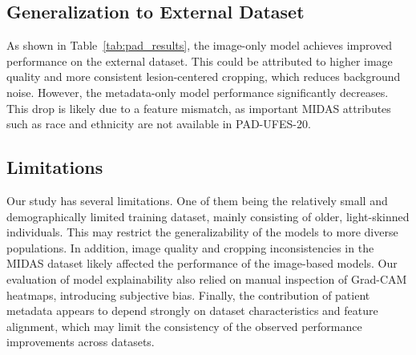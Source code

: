\documentclass{article}
\begin{document}
	
	
	
	
	
	
	\subsection{Generalization to External Dataset}
	As shown in Table~\ref{tab:pad_results}, the image-only model achieves improved performance on the external dataset. This could be attributed to higher image quality and more consistent lesion-centered cropping, which reduces background noise. %
	However, the metadata-only model performance significantly decreases. This drop is likely due to a feature mismatch, as important MIDAS attributes such as race and ethnicity are not available in PAD-UFES-20.
	

	\subsection{Limitations}
	Our study has several limitations. One of them being the relatively small and demographically limited training dataset, mainly consisting of older, light-skinned individuals. This may restrict the generalizability of the models to more diverse populations.
	In addition, image quality and cropping inconsistencies in the MIDAS dataset likely affected the performance of the image-based models. Our evaluation of model explainability also relied on manual inspection of Grad-CAM heatmaps, introducing subjective bias.
	Finally, the contribution of patient metadata appears to depend strongly on dataset characteristics and feature alignment, which may limit the consistency of the observed performance improvements across datasets.
\end{document}
